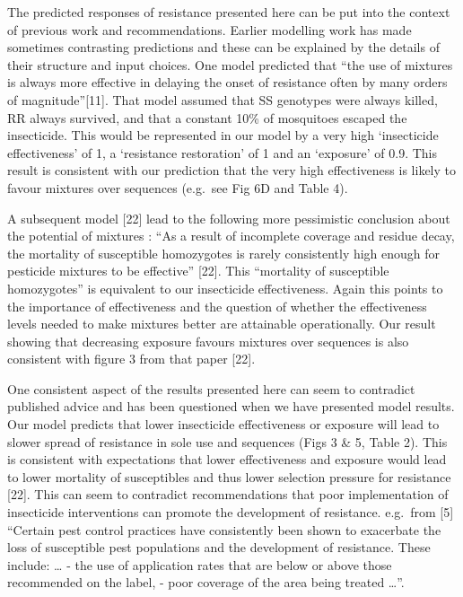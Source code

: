 \documentclass[11pt,]{article}
\begin{document}
The predicted responses of resistance presented here can be put into the
context of previous work and recommendations. Earlier modelling work has
made sometimes contrasting predictions and these can be explained by the
details of their structure and input choices. One model predicted that
``the use of mixtures is always more effective in delaying the onset of
resistance often by many orders of magnitude''{[}11{]}. That model
assumed that SS genotypes were always killed, RR always survived, and
that a constant 10\% of mosquitoes escaped the insecticide. This would
be represented in our model by a very high `insecticide effectiveness'
of 1, a `resistance restoration' of 1 and an `exposure' of 0.9. This
result is consistent with our prediction that the very high
effectiveness is likely to favour mixtures over sequences (e.g.~see Fig
6D and Table 4).

A subsequent model {[}22{]} lead to the following more pessimistic
conclusion about the potential of mixtures : ``As a result of incomplete
coverage and residue decay, the mortality of susceptible homozygotes is
rarely consistently high enough for pesticide mixtures to be effective''
{[}22{]}. This ``mortality of susceptible homozygotes'' is equivalent to
our insecticide effectiveness. Again this points to the importance of
effectiveness and the question of whether the effectiveness levels
needed to make mixtures better are attainable operationally. Our result
showing that decreasing exposure favours mixtures over sequences is also
consistent with figure 3 from that paper {[}22{]}.

One consistent aspect of the results presented here can seem to
contradict published advice and has been questioned when we have
presented model results. Our model predicts that lower insecticide
effectiveness or exposure will lead to slower spread of resistance in
sole use and sequences (Figs 3 \& 5, Table 2). This is consistent with
expectations that lower effectiveness and exposure would lead to lower
mortality of susceptibles and thus lower selection pressure for
resistance {[}22{]}. This can seem to contradict recommendations that
poor implementation of insecticide interventions can promote the
development of resistance. e.g.~from {[}5{]} ``Certain pest control
practices have consistently been shown to exacerbate the loss of
susceptible pest populations and the development of resistance. These
include: \ldots{} - the use of application rates that are below or above
those recommended on the label, - poor coverage of the area being
treated \ldots{}''.
\end{document}
